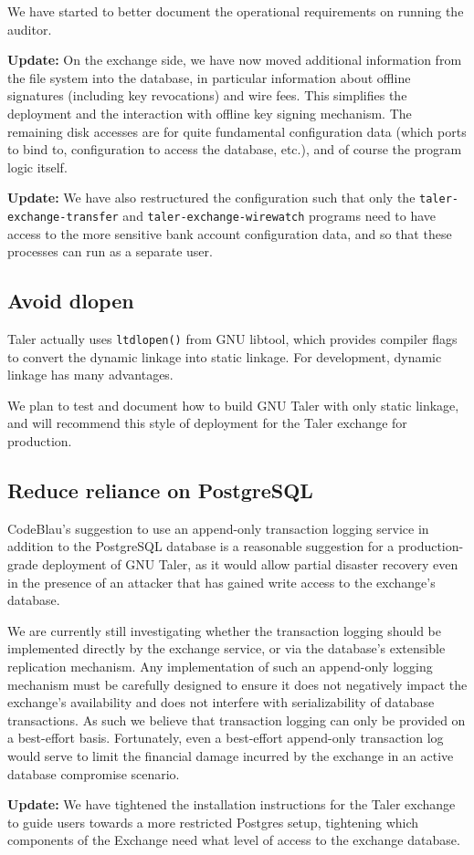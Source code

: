 \documentclass[11pt]{article}
\begin{document}
We have started to better document the operational requirements on running the
auditor.

{\bf Update:} On the exchange side, we have now moved additional information
from the file system into the database, in particular information about offline signatures
(including key revocations) and wire fees.  This simplifies the deployment and
the interaction with offline key signing mechanism.  The remaining disk accesses are for
quite fundamental configuration data (which ports to bind to, configuration to
access the database, etc.), and of course the program logic itself.

{\bf Update:} We have also restructured the configuration such that only
the {\tt taler-exchange-transfer} and {\tt taler-exchange-wirewatch} programs
need to have access to the more sensitive bank account configuration data,
and so that these processes can run as a separate user.


\subsection{Avoid dlopen}

Taler actually uses {\tt ltdlopen()} from GNU libtool, which provides
compiler flags to convert the dynamic linkage into static linkage.  For
development, dynamic linkage has many advantages.

We plan to test and document how to build GNU Taler with only static
linkage, and will recommend this style of deployment for the Taler
exchange for production.

\subsection{Reduce reliance on PostgreSQL}

CodeBlau's suggestion to use an append-only transaction logging service in
addition to the PostgreSQL database is a reasonable suggestion for a
production-grade deployment of GNU Taler, as it would allow partial disaster
recovery even in the presence of an attacker that has gained write access to
the exchange's database.

We are currently still investigating whether the transaction logging should be
implemented directly by the exchange service, or via the database's extensible
replication mechanism.  Any implementation of such an append-only logging
mechanism must be carefully designed to ensure it does not negatively impact
the exchange's availability and does not interfere with serializability of
database transactions.  As such we believe that transaction logging can only be
provided on a best-effort basis.  Fortunately, even a best-effort append-only
transaction log would serve to limit the financial damage incurred by the
exchange in an active database compromise scenario.

{\bf Update:} We have tightened the installation instructions for the
Taler exchange to guide users towards a more restricted Postgres setup,
tightening which components of the Exchange need what level of access
to the exchange database.
\end{document}
